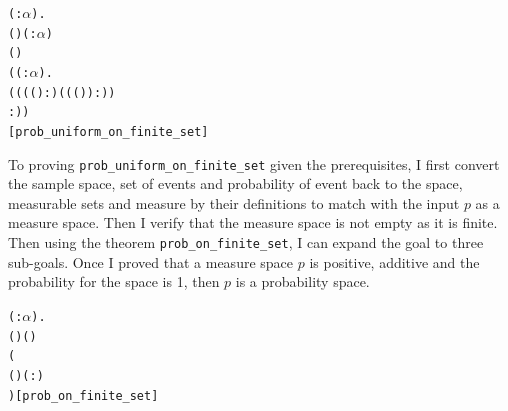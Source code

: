 \documentclass{article}
\begin{document}
\begin{alltt}
  \HOLTokenTurnstile{} \HOLSymConst{\HOLTokenForall{}}( :\ensuremath{\alpha} ).
      ( ) \HOLSymConst{\HOLTokenConj{}}   \HOLSymConst{\HOLTokenNotEqual{}} (\HOLSymConst{\HOLTokenEmpty{}} :\ensuremath{\alpha} \HOLTokenMap{} ) \HOLSymConst{\HOLTokenConj{}}
       \HOLSymConst{=}  ( ) \HOLSymConst{\HOLTokenConj{}}
     (\HOLSymConst{\HOLTokenForall{}}( :\ensuremath{\alpha} \HOLTokenMap{} ).
         \HOLSymConst{\HOLTokenIn{}}   \HOLSymConst{\HOLTokenImp{}}
           \HOLSymConst{=}
        ((((\HOLSymConst{\&} ) :) \HOLSymConst{/} ((\HOLSymConst{\&} ( )) :))
           :)) \HOLSymConst{\HOLTokenImp{}}
      \hfill{[prob_uniform_on_finite_set]}
\end{alltt}

To proving \verb|prob_uniform_on_finite_set| given the prerequisites, I first convert the sample space,
set of events and probability of event back
to the space, measurable sets and measure by their definitions to match with the input $p$ as a measure space. Then I
verify that the measure space is not empty as it is finite.
Then using the theorem \verb|prob_on_finite_set|, I can
expand the goal to three sub-goals. Once I proved that a measure space $p$ is positive, additive and the probability
for the space is 1, then $p$ is a probability space.

\begin{alltt}
  \HOLTokenTurnstile{} \HOLSymConst{\HOLTokenForall{}}( :\ensuremath{\alpha} ).
      ( ) \HOLSymConst{\HOLTokenConj{}}   \HOLSymConst{=}  ( ) \HOLSymConst{\HOLTokenImp{}}
     (  \HOLSymConst{\HOLTokenEquiv{}}
        \HOLSymConst{\HOLTokenConj{}}   ( ) \HOLSymConst{=} ( :) \HOLSymConst{\HOLTokenConj{}}
       )\hfill{[prob_on_finite_set]}
\end{alltt}
\end{document}

